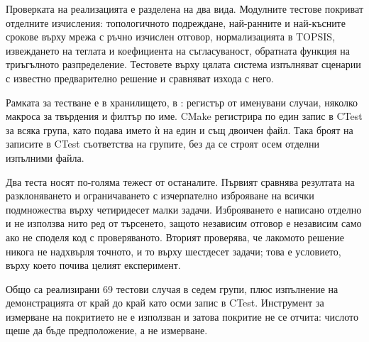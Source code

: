 Проверката на реализацията е разделена на два вида. Модулните тестове покриват
отделните изчисления: топологичното подреждане, най-ранните и най-късните срокове
върху мрежа с ръчно изчислен отговор, нормализацията в TOPSIS, извеждането на
теглата и коефициента на съгласуваност, обратната функция на триъгълното
разпределение. Тестовете върху цялата система изпълняват сценарии с известно
предварително решение и сравняват изхода с него.

Рамката за тестване е в хранилището, в : регистър от
именувани случаи, няколко макроса за твърдения и филтър по име. CMake регистрира
по един запис в CTest за всяка група, като подава името ѝ на един и същ двоичен
файл. Така броят на записите в CTest съответства на групите, без да се строят
осем отделни изпълними файла.

Два теста носят по-голяма тежест от останалите. Първият сравнява резултата на
разклоняването и ограничаването с изчерпателно изброяване на всички подмножества
върху четиридесет малки задачи. Изброяването е написано отделно и не използва нито
ред от търсенето, защото независим отговор е независим само ако не споделя код с
проверяваното. Вторият проверява, че лакомото решение никога не надхвърля точното,
и то върху шестдесет задачи; това е условието, върху което почива целият
експеримент.

Общо са реализирани 69 тестови случая в седем групи, плюс изпълнение на
демонстрацията от край до край като осми запис в CTest. Инструмент за измерване
на покритието не е използван и затова покритие не се отчита: числото щеше да бъде
предположение, а не измерване.
